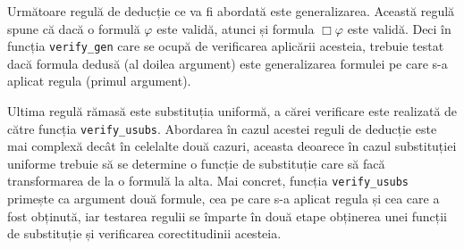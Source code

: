 \documentclass[12pt, openany]{book}
\begin{document}
            \par{}
                Următoare regulă de deducție ce va fi abordată este generalizarea. Această regulă spune că dacă o 
                formulă $\varphi$ este validă, atunci și formula $\Box \varphi$ este validă. Deci în funcția 
                \texttt{verify\_gen} care se ocupă de verificarea aplicării acesteia, trebuie testat dacă formula 
                dedusă (al doilea argument) este generalizarea formulei pe care s-a aplicat regula (primul argument).

            \par{}
                Ultima regulă rămasă este substituția uniformă, a cărei verificare este realizată de către funcția 
                \texttt{verify\_usubs}. Abordarea în cazul acestei reguli de deducție este mai complexă decât în 
                celelalte două cazuri, aceasta deoarece în cazul substituției uniforme trebuie să se determine o funcție
                de substituție care să facă transformarea de la o formulă la alta. Mai concret, funcția
                \texttt{verify\_usubs} primește ca argument două formule, cea pe care s-a aplicat regula și cea care a 
                fost obținută, iar testarea regulii se împarte în două etape obținerea unei funcții de substituție și 
                verificarea corectitudinii acesteia. 
\end{document}
